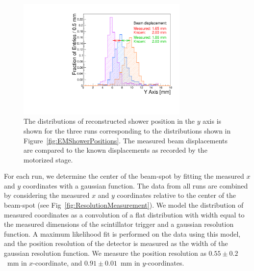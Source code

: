 \documentclass[12pt]{article}
\begin{document}
\begin{figure}[htbp]
\centering
\includegraphics[width=0.75\textwidth]{Images/centers/superimposed.pdf}
\caption{The distributions of reconstructed shower position in the $y$ axis is
shown for the three runs corresponding to the distributions shown in
Figure~\ref{fig:EMShowerPositions}. The measured beam displacements are compared
to the known displacements as recorded by the motorized stage. }
\label{fig:EMShowerYPositionComparison} 
\end{figure} 

For each run, we determine the center of the beam-spot by fitting the measured
$x$ and $y$ coordinates with a gaussian function. The data from all runs are
combined by considering the measured $x$ and $y$ coordinates relative to the
center of the beam-spot (see Fig~\ref{fig:ResolutionMeasurement}). We model the
distribution of measured coordinates as a convolution of a flat distribution
with width equal to the measured dimensions of the scintillator trigger and a
gaussian resolution function. A maximum likelihood fit is performed on the data
using this model, and the position resolution of the detector is measured as the
width of the gaussian resolution function. We measure the position resolution as
$0.55\pm0.2$~mm in $x$-coordinate, and $0.91\pm 0.01$~mm in $y$-coordinates.
\end{document}

